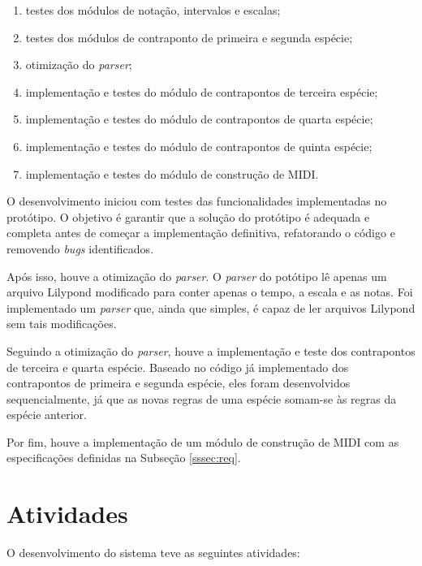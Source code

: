     \begin{enumerate}
      \item testes dos módulos de notação, intervalos e escalas;
      \item testes dos módulos de contraponto de primeira e segunda espécie;
      \item otimização do \textit{parser};
      \item implementação e testes do módulo de contrapontos de terceira espécie;
      \item implementação e testes do módulo de contrapontos de quarta espécie;
      \item implementação e testes do módulo de contrapontos de quinta espécie;
      \item implementação e testes do módulo de construção de MIDI.
    \end{enumerate}

    O desenvolvimento iniciou com testes das funcionalidades implementadas no protótipo. O objetivo é garantir que a solução do protótipo é adequada e completa antes de começar a implementação definitiva, refatorando o código e removendo \textit{bugs} identificados.

    Após isso, houve a otimização do \textit{parser}. O \textit{parser} do potótipo lê apenas um arquivo Lilypond modificado para conter apenas o tempo, a escala e as notas. Foi implementado um \textit{parser} que, ainda que simples, é capaz de ler arquivos Lilypond sem tais modificações.

    Seguindo a otimização do \textit{parser}, houve a implementação e teste dos contrapontos de terceira e quarta espécie. Baseado no código já implementado dos contrapontos de primeira e segunda espécie, eles foram desenvolvidos sequencialmente, já que as novas regras de uma espécie somam-se às regras da espécie anterior.

    Por fim, houve a implementação de um módulo de construção de MIDI com as especificações definidas na Subseção \ref{sssec:req}.

  \section[Atividades]{Atividades}

  O desenvolvimento do sistema teve as seguintes atividades:

